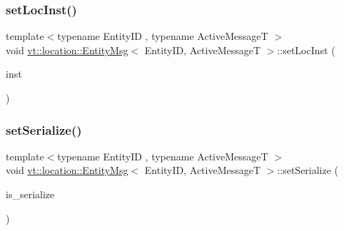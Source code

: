 \subsubsection{\texorpdfstring{set\+Loc\+Inst()}{setLocInst()}}
{\footnotesize\ttfamily template$<$typename Entity\+ID , typename Active\+MessageT $>$ \\
void \hyperlink{structvt_1_1location_1_1_entity_msg}{vt\+::location\+::\+Entity\+Msg}$<$ Entity\+ID, Active\+MessageT $>$\+::set\+Loc\+Inst (\begin{DoxyParamCaption}\item[{\hyperlink{namespacevt_1_1location_a4db6456e8024af2d23fc5ae560fef866}{Loc\+Inst\+Type} const \&}]{inst }\end{DoxyParamCaption})\hspace{0.3cm}{\ttfamily [inline]}}

\mbox{\label{structvt_1_1location_1_1_entity_msg_a3a26a497f5d3107ca513582c842963bd}} 
\subsubsection{\texorpdfstring{set\+Serialize()}{setSerialize()}}
{\footnotesize\ttfamily template$<$typename Entity\+ID , typename Active\+MessageT $>$ \\
void \hyperlink{structvt_1_1location_1_1_entity_msg}{vt\+::location\+::\+Entity\+Msg}$<$ Entity\+ID, Active\+MessageT $>$\+::set\+Serialize (\begin{DoxyParamCaption}\item[{bool const}]{is\+\_\+serialize }\end{DoxyParamCaption})\hspace{0.3cm}{\ttfamily [inline]}}

\mbox{\label{structvt_1_1location_1_1_entity_msg_ac7426fc8a8631a33f16b389f489631c2}} 
